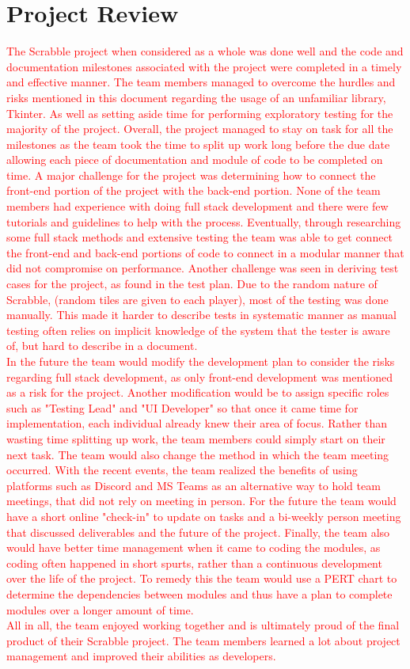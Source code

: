 \documentclass{article}
\begin{document}
\section{Project Review}
\textcolor{red}{The Scrabble project when considered as a whole was done well and the code and documentation milestones associated with the project were completed in a timely and effective manner. The team members managed to overcome the hurdles and risks mentioned in this document regarding the usage of an unfamiliar library, Tkinter. As well as setting aside time for performing exploratory testing for the majority of the project. Overall, the project managed to stay on task for all the milestones as the team took the time to split up work long before the due date allowing each piece of documentation and module of code to be completed on time. A major challenge for the project was determining how to connect the front-end portion of the project with the back-end portion. None of the team members had experience with doing full stack development and there were few tutorials and guidelines to help with the process. Eventually, through researching some full stack methods and extensive testing the team was able to get connect the front-end and back-end portions of code to connect in a modular manner that did not compromise on performance. Another challenge was seen in deriving test cases for the project, as found in the test plan. Due to the random nature of Scrabble, (random tiles are given to each player), most of the testing was done manually. This made it harder to describe tests in systematic manner as manual testing often relies on implicit knowledge of the system that the tester is aware of, but hard to describe in a document.}\\
\textcolor{red}{In the future the team would modify the development plan to consider the risks regarding full stack development, as only front-end development was mentioned as a risk for the project. Another modification would be to assign specific roles such as "Testing Lead" and "UI Developer" so that once it came time for implementation, each individual already knew their area of focus. Rather than wasting time splitting up work, the team members could simply start on their next task. The team would also change the method in which the team meeting occurred. With the recent events, the team realized the benefits of using platforms such as Discord and MS Teams as an alternative way to hold team meetings, that did not rely on meeting in person. For the future the team would have a short online "check-in" to update on tasks and a bi-weekly person meeting that discussed deliverables and the future of the project. Finally, the team also would have better time management when it came to coding the modules, as coding often happened in short spurts, rather than a continuous development over the life of the project. To remedy this the team would use a PERT chart to determine the dependencies between modules and thus have a plan to complete modules over a longer amount of time.}\\
\textcolor{red}{All in all, the team enjoyed working together and is ultimately proud of the final product of their Scrabble project. The team members learned a lot about project management and improved their abilities as developers.}\\

\newpage
 

\end{document}
